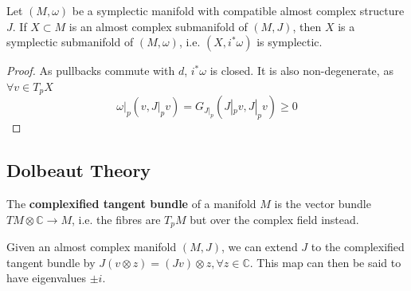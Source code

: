 \documentclass[11pt, final]{article}
\begin{document}
\begin{prop}\label{prop:almostCplxSymp}
	Let $(M,\omega)$ be a symplectic manifold with compatible almost complex structure $J$. If $X \subset M$ is an almost complex submanifold of $(M,J)$, then $X$ is a symplectic submanifold of $(M,\omega)$, i.e. $(X,i^*\omega)$ is symplectic.
\end{prop}
\begin{proof}
	As pullbacks commute with $d$, $i^* \omega$ is closed. It is also non-degenerate, as $\forall v \in T_pX$
		\begin{equation}
			\omega|_p (v, J|_p v) = G_{J|_p} ( J|_p v, J|_p v) \geq 0
		\end{equation}
\end{proof}

\subsection{Dolbeaut Theory}

\begin{definition}
	The \textbf{complexified tangent bundle} of a manifold $M$ is the vector bundle $TM \otimes \mathbb{C} \to M$, i.e. the fibres are $T_pM$ but over the complex field instead.
\end{definition}
\begin{remark}
	Given an almost complex manifold $(M,J)$, we can extend $J$ to the complexified tangent bundle by $J(v \otimes z) = (Jv) \otimes z, \forall z \in \mathbb{C}$. This map can then be said to have eigenvalues $\pm i$.
\end{remark}
\end{document}
